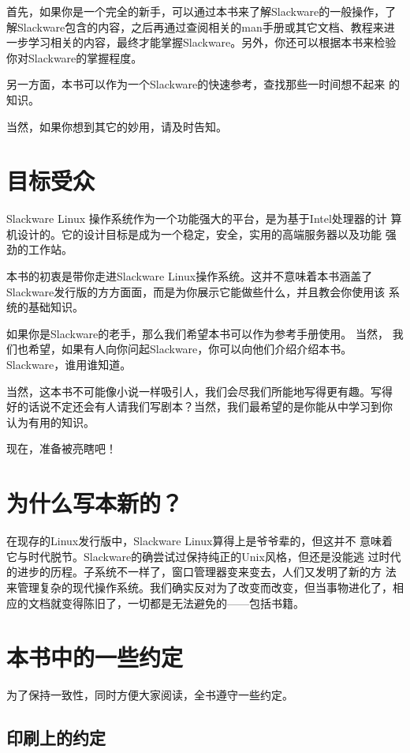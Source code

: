 首先，如果你是一个完全的新手，可以通过本书来了解Slackware的一般操作，了
解Slackware包含的内容，之后再通过查阅相关的man手册或其它文档、教程来进
一步学习相关的内容，最终才能掌握Slackware。另外，你还可以根据本书来检验
你对Slackware的掌握程度。

另一方面，本书可以作为一个Slackware的快速参考，查找那些一时间想不起来
的知识。

当然，如果你想到其它的妙用，请及时告知。


\section*{目标受众}
\label{sec:preface:intendedAudience}
Slackware Linux 操作系统作为一个功能强大的平台，是为基于Intel处理器的计
算机设计的。它的设计目标是成为一个稳定，安全，实用的高端服务器以及功能
强劲的工作站。

本书的初衷是带你走进Slackware Linux操作系统。这并不意味着本书涵盖了
Slackware发行版的方方面面，而是为你展示它能做些什么，并且教会你使用该
系统的基础知识。

如果你是Slackware的老手，那么我们希望本书可以作为参考手册使用。 当然，
我们也希望，如果有人向你问起Slackware，你可以向他们介绍介绍本书。
Slackware，谁用谁知道。

当然，这本书不可能像小说一样吸引人，我们会尽我们所能地写得更有趣。写得
好的话说不定还会有人请我们写剧本？当然，我们最希望的是你能从中学习到你
认为有用的知识。

现在，准备被亮瞎吧！

\section*{为什么写本新的？}
\label{sec:preface:whyANewSlackwareBook}
在现存的Linux发行版中，Slackware Linux算得上是爷爷辈的，但这并不
意味着它与时代脱节。Slackware的确尝试过保持纯正的Unix风格，但还是没能逃
过时代的进步的历程。子系统不一样了，窗口管理器变来变去，人们又发明了新的方
法来管理复杂的现代操作系统。我们确实反对为了改变而改变，但当事物进化了，相
应的文档就变得陈旧了，一切都是无法避免的——包括书籍。


\section*{本书中的一些约定}
\label{sec:preface:conventionsUsedInThisBook}

为了保持一致性，同时方便大家阅读，全书遵守一些约定。

\subsection*{印刷上的约定}
\label{sec:preface:conventions:typographic}

